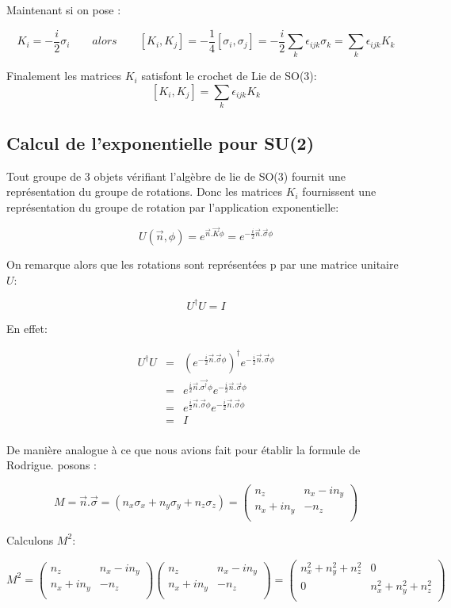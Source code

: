 \documentclass[12pt,a4paper]{article}
\begin{document}
	Maintenant si on pose :
	
	\[
		\boxed{K_i=-\frac{i}{2}\sigma_i}
	\quad\quad alors \quad\quad
	[K_i,K_j]=-\frac{1}{4}[\sigma_i,\sigma_j]=-\frac{i}{2} \sum_k \epsilon_{ijk}\sigma_k = \sum_k \epsilon_{ijk}K_k
	\]
	
	Finalement les matrices $K_i$ satisfont le crochet de Lie de SO(3):
	\[
	\boxed{[K_i,K_j]= \sum_k \epsilon_{ijk}K_k}
	\]
	
\newpage
\subsection{Calcul de l'exponentielle pour SU(2)}

Tout groupe de 3 objets vérifiant l'algèbre de lie de SO(3) fournit une représentation du groupe de rotations. Donc les matrices $K_i$ fournissent une représentation du groupe de rotation par l'application exponentielle:

\[
\boxed{U(\vec{n},\phi) = e^{\vec{n}.\vec{K} \phi}= e^{-\frac{i}{2}\vec{n}.\vec{\sigma} \phi}}
\]

On remarque alors que les rotations sont représentées p par une matrice unitaire $U$:

\[
\boxed{U^{\dagger}U=I}
\] 

En effet:

\begin{eqnarray*}
U^{\dagger}U&=&\left(e^{-\frac{i}{2}\vec{n}.\vec{\sigma} \phi}\right)^\dagger e^{-\frac{i}{2}\vec{n}.\vec{\sigma} \phi}\\
&=&e^{\frac{i}{2}\vec{n}.\vec{\sigma^\dagger} \phi} e^{-\frac{i}{2}\vec{n}.\vec{\sigma} \phi}\\
&=&e^{\frac{i}{2}\vec{n}.\vec{\sigma} \phi} e^{-\frac{i}{2}\vec{n}.\vec{\sigma} \phi}\\
&=&I\\
\end{eqnarray*}

De manière analogue à ce que nous avions fait pour établir la formule de Rodrigue. posons :

\[
	M=\vec{n}.\vec{\sigma}=(n_x \sigma_x+n_y \sigma_y+n_z \sigma_z)= \begin{pmatrix}
	n_z&n_x-i n_y\\
	n_x+i n_y&-n_z\\
	\end{pmatrix}
\]

Calculons $M^2$:

\[
	M^2=\begin{pmatrix}
	n_z&n_x-i n_y\\
	n_x+i n_y&-n_z\\
	\end{pmatrix}
	\begin{pmatrix}
	n_z&n_x-i n_y\\
	n_x+i n_y&-n_z\\
	\end{pmatrix}
	=
	\begin{pmatrix}
	n_x^2+ n_y^2+n_z^2&0\\
	0&n_x^2+ n_y^2+n_z^2\\
	\end{pmatrix}
\]
\end{document}
